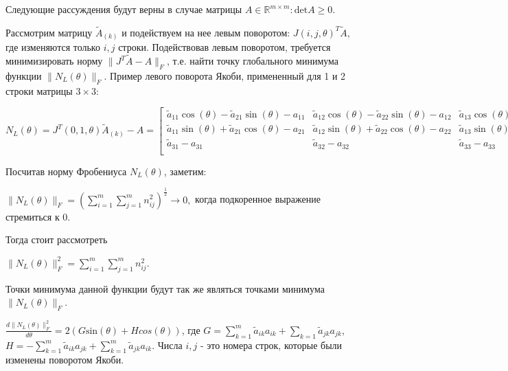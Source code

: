 Следующие рассуждения будут верны в случае матрицы $A \in \mathbb{R}^{m \times m}: \mathrm{det}A \ge0$.

Рассмотрим матрицу $\tilde{A}_{(k)}$ и подействуем на нее левым поворотом: $J(i, j,\theta)^T\tilde{A}$, где изменяются только $i, j$ строки. Подействовав левым поворотом, требуется минимизировать норму $\|J^T\tilde{A} - A\|_F$, т.е. найти точку глобального минимума функции $\|N_{L}(\theta) \|_F$. Пример левого поворота Якоби, примененный для 1 и 2 строки матрицы $3\times 3$: 
\begin{center}
    $N_{L}(\theta) = J^T(0,1,\theta)\tilde{A}_{(k)} - A = \left[\begin{matrix}\tilde{a}_{11} \cos{\left(\theta \right)} - \tilde{a}_{21} \sin{\left(\theta \right)} - {a}_{11} & \tilde{a}_{12} \cos{\left(\theta \right)} - \tilde{a}_{22} \sin{\left(\theta \right)} - {a}_{12} & \tilde{a}_{13} \cos{\left(\theta \right)} - \tilde{a}_{23} \sin{\left(\theta \right)} - {a}_{13}\\\tilde{a}_{11} \sin{\left(\theta \right)} + \tilde{a}_{21} \cos{\left(\theta \right)} - {a}_{21} & \tilde{a}_{12} \sin{\left(\theta \right)} + \tilde{a}_{22} \cos{\left(\theta \right)} - {a}_{22} & \tilde{a}_{13} \sin{\left(\theta \right)} + \tilde{a}_{23} \cos{\left(\theta \right)} - {a}_{23}\\\tilde{a}_{31} - {a}_{31} & \tilde{a}_{32} - {a}_{32} & \tilde{a}_{33} - {a}_{33} \\ \end{matrix}\right].$ 
\end{center}
Посчитав норму Фробениуса $N_{L}(\theta)$, заметим:
\begin{center}
$\|N_{L}(\theta)\|_F = \left( \sum_{i = 1}^m\sum_{j = 1}^m n_{ij}^2\right)^{\frac{1}{2}} \longrightarrow 0,$ когда подкоренное выражение стремиться к 0.
\end{center} 
Тогда стоит рассмотреть 
\begin{center}
    $\|N_{L}(\theta)\|_F^2 = \sum_{i = 1}^m\sum_{j = 1}^m n_{ij}^2$.
\end{center} 
Точки минимума данной функции будут так же являться точками минимума $\|N_{L}(\theta)\|_F$. 
\begin{claim}
    $\frac{d\|N_L(\theta) \|^2_F}{d\theta} = 2(G\mathrm{sin}(\theta) + Hcos(\theta))$, где $G = \sum_{k = 1}^m\tilde{a}_{ik}a_{ik} + \sum_{k=1}\tilde{a}_{jk}a_{jk}$, $H = -\sum_{k = 1}^m\tilde{a}_{ik}a_{jk} + \sum_{k = 1}^m\tilde{a}_{jk}a_{ik}$. Числа $i,j$ - это номера строк, которые были изменены поворотом Якоби.
\end{claim}
